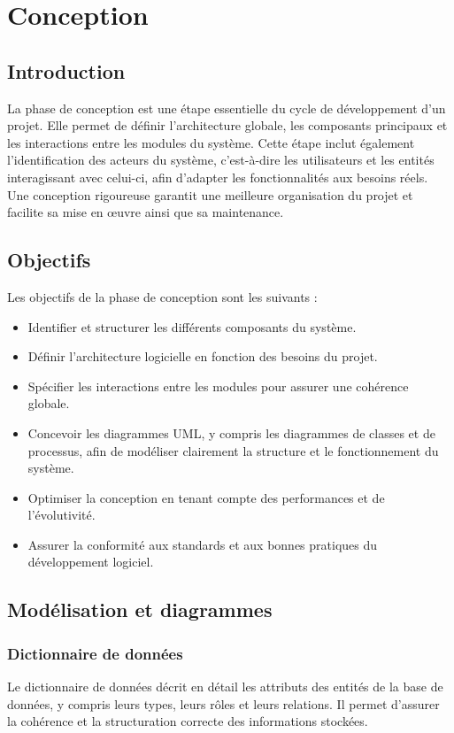 \chapter{Conception}
\clearpage

\section{Introduction}
La phase de conception est une étape essentielle du cycle de développement d'un projet. Elle permet de définir l'architecture globale, les composants principaux et les interactions entre les modules du système. Cette étape inclut également l'identification des acteurs du système, c'est-à-dire les utilisateurs et les entités interagissant avec celui-ci, afin d'adapter les fonctionnalités aux besoins réels. Une conception rigoureuse garantit une meilleure organisation du projet et facilite sa mise en œuvre ainsi que sa maintenance.

\section{Objectifs}
Les objectifs de la phase de conception sont les suivants :
\begin{itemize}
    \item Identifier et structurer les différents composants du système.
    \item Définir l'architecture logicielle en fonction des besoins du projet.
    \item Spécifier les interactions entre les modules pour assurer une cohérence globale.
    \item Concevoir les diagrammes UML, y compris les diagrammes de classes et de processus, afin de modéliser clairement la structure et le fonctionnement du système.
    \item Optimiser la conception en tenant compte des performances et de l'évolutivité.
    \item Assurer la conformité aux standards et aux bonnes pratiques du développement logiciel.
\end{itemize}


\section{Modélisation et diagrammes}


\subsection{Dictionnaire de données}
Le dictionnaire de données décrit en détail les attributs des entités de la base de données, y compris leurs types, leurs rôles et leurs relations. Il permet d'assurer la cohérence et la structuration correcte des informations stockées.

